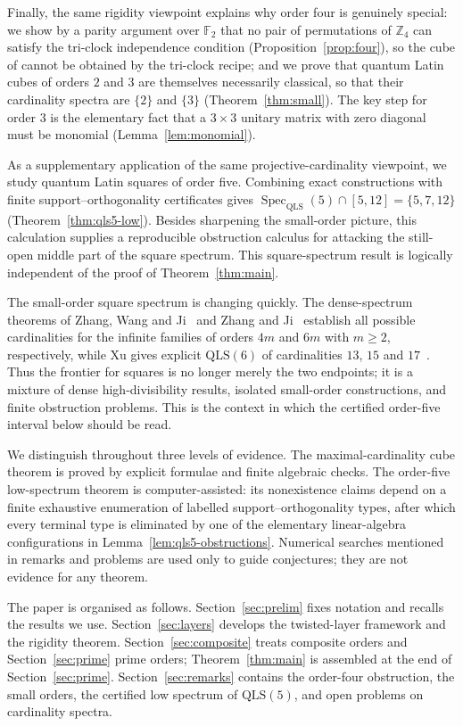 \documentclass[11pt]{amsart}
\theoremstyle{definition}
\newcommand{\Z}{\mathbb{Z}}
\newcommand{\F}{\mathbb{F}}
\newcommand{\QLS}{\mathrm{QLS}}
\begin{document}
Finally, the same rigidity viewpoint explains why order four is genuinely
special: we show by a parity argument over $\F_2$ that no pair of
permutations of $\Z_4$ can satisfy the tri-clock independence condition
(Proposition~\ref{prop:four}), so the cube of \cite[Ex.~4.1]{ZZLC2026} cannot
be obtained by the tri-clock recipe; and we prove that quantum Latin cubes
of orders $2$ and $3$ are themselves necessarily classical, so that their
cardinality spectra are $\{2\}$ and $\{3\}$ (Theorem~\ref{thm:small}).
The key step for order $3$ is the elementary fact that a $3\times3$
unitary matrix with zero diagonal must be monomial
(Lemma~\ref{lem:monomial}).

As a supplementary application of the same projective-cardinality viewpoint,
we study quantum Latin squares of order five.  Combining exact constructions
with finite support--orthogonality certificates gives
$\operatorname{Spec}_{\QLS}(5)\cap[5,12]=\{5,7,12\}$
(Theorem~\ref{thm:qls5-low}).  Besides sharpening the small-order picture,
this calculation supplies a reproducible obstruction calculus for attacking
the still-open middle part of the square spectrum.  This square-spectrum
result is logically independent of the proof of Theorem~\ref{thm:main}.

The small-order square spectrum is changing quickly.  The dense-spectrum
theorems of Zhang, Wang and Ji~\cite{ZWJ2026} and Zhang and
Ji~\cite{ZhangJi2026} establish all possible cardinalities for the infinite
families of orders $4m$ and $6m$ with $m\ge2$, respectively, while Xu gives
explicit $\QLS(6)$ of cardinalities $13$, $15$ and
$17$~\cite{Xu2026}.  Thus the frontier for squares is no longer merely the
two endpoints; it is a mixture of dense high-divisibility results, isolated
small-order constructions, and finite obstruction problems.  This is the
context in which the certified order-five interval below should be read.

We distinguish throughout three levels of evidence.  The maximal-cardinality
cube theorem is proved by explicit formulae and finite algebraic checks.  The
order-five low-spectrum theorem is computer-assisted: its nonexistence
claims depend on a finite exhaustive enumeration of labelled
support--orthogonality types, after which every terminal type is eliminated
by one of the elementary linear-algebra configurations in
Lemma~\ref{lem:qls5-obstructions}.  Numerical searches mentioned in remarks
and problems are used only to guide conjectures; they are not evidence for
any theorem.

The paper is organised as follows.  Section~\ref{sec:prelim} fixes notation
and recalls the results we use.  Section~\ref{sec:layers} develops the
twisted-layer framework and the rigidity theorem.
Section~\ref{sec:composite} treats composite orders and
Section~\ref{sec:prime} prime orders; Theorem~\ref{thm:main} is assembled at
the end of Section~\ref{sec:prime}.  Section~\ref{sec:remarks} contains the
order-four obstruction, the small orders, the certified low spectrum of
$\QLS(5)$, and open problems on cardinality spectra.
\end{document}
